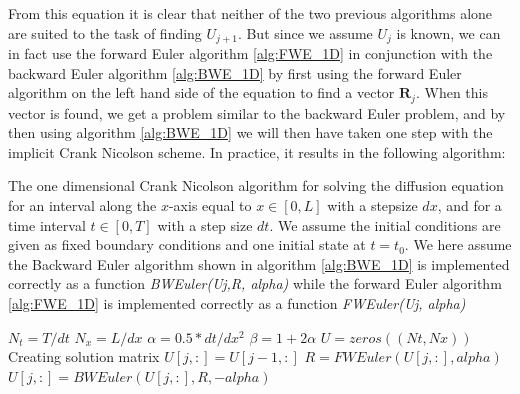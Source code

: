 \documentclass[a4paper,10pt,english]{article}
\renewcommand{\vec}[1]{\mathbf{#1}}
\begin{document}
From this equation it is clear that neither of the two previous algorithms alone are suited to the task of finding $U_{j+1}$. But since we assume $U_{j}$ is known, we can in fact use the forward Euler algorithm \ref{alg:FWE_1D} in conjunction with the backward Euler algorithm \ref{alg:BWE_1D} by first using the forward Euler algorithm on the left hand side of the equation to find a vector $\vec{R}_j$. When this vector is found, we get a problem similar to the backward Euler problem, and by then using algorithm \ref{alg:BWE_1D} we will then have taken one step with the implicit Crank Nicolson scheme. In practice, it results in the following algorithm:

\begin{algorithm}[H]
\centering
\caption{The one dimensional Crank Nicolson algorithm for solving the diffusion equation for an interval along the $x$-axis equal to $x \in [0,L]$ with a stepsize $dx$, and for a time interval $t \in [0,T]$ with a step size $dt$. We assume the initial conditions are given as fixed boundary conditions and one initial state at $t=t_0$. We here assume the Backward Euler algorithm shown in algorithm \ref{alg:BWE_1D} is implemented correctly as a function  \textit{BWEuler(Uj,R, alpha)} while the forward Euler algorithm \ref{alg:FWE_1D} is implemented correctly as a function \textit{FWEuler(Uj, alpha) } \label{alg:CN_1D}}
	\begin{algorithmic}[1]
		\State $N_t = T/dt$
		\State $N_x = L/dx$
		\State $\alpha = 0.5*dt/dx^2$
		\State $\beta = 1 + 2\alpha$
		\State $U = zeros((Nt,Nx))$
		\Comment Creating solution matrix
			\State $U[j,:] = U[j-1,:]$
			\State $R = FWEuler(U[j,:],alpha)$ 
			\State $U[j,:] = BWEuler(U[j,:],R,-alpha)$
		\EndFor
	\end{algorithmic}
\end{algorithm}
\end{document}

